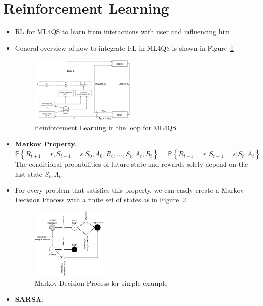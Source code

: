 \section{Reinforcement Learning}
\begin{itemize}
	\item RL for ML4QS to learn from interactions with user and influencing him
	\item General overview of how to integrate RL in ML4QS is shown in Figure~\ref{fig:chapter_9_RL_loop}
	\begin{figure}[ht!]
		\centering
		\includegraphics[width=0.5\textwidth]{figures/chapter_9_RL_loop.png}
		\caption{Reinforcement Learning in the loop for ML4QS}
		\label{fig:chapter_9_RL_loop}
	\end{figure}
	\item \textbf{Markov Property}: $\mathbb{P}\left\{R_{t+1}=r, S_{t+1}=s|S_0, A_0, R_0, ..., S_t, A_t, R_t\right\} = \mathbb{P}\left\{R_{t+1}=r, S_{t+1}=s|S_t, A_t\right\}$\\
	The conditional probabilities of future state and rewards solely depend on the last state $S_t, A_t$. 
	\item For every problem that satisfies this property, we can easily create a Markov Decision Process with a finite set of states as in Figure~\ref{fig:chapter_9_MDP}
	\begin{figure}[ht!]
		\centering
		\includegraphics[width=0.35\textwidth]{figures/chapter_9_MDP.png}
		\caption{Markov Decision Process for simple example}
		\label{fig:chapter_9_MDP}
	\end{figure}
	\item \textbf{SARSA}:
	\begin{itemize}

\end{itemize}
\end{itemize}
